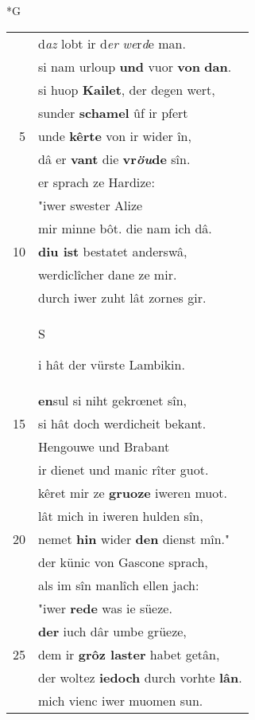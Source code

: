 \documentclass[8pt,a4paper,notitlepage]{article}
\begin{document}
\newpage
\begin{table}[ht]
\begin{minipage}[t]{0.5\linewidth}
\small
\begin{center}*G
\end{center}
\begin{tabular}{rl}
 & d\textit{az} lobt ir d\textit{er} \textit{we}r\textit{d}e man.\\ 
 & si nam urloup \textbf{und} vuor \textbf{von} \textbf{dan}.\\ 
 & si huop \textbf{Kailet}, der degen wert,\\ 
 & sunder \textbf{schamel} ûf ir pfert\\ 
5 & unde \textbf{kêrte} von ir wider în,\\ 
 & dâ er \textbf{vant} die \textbf{vr\textit{öu}de} sîn.\\ 
 & er sprach ze Hardize:\\ 
 & "iwer swester Alize\\ 
 & mir minne bôt. die nam ich dâ.\\ 
10 & \textbf{diu ist} bestatet anderswâ,\\ 
 & werdiclîcher dane ze mir.\\ 
 & durch iwer zuht lât zornes gir.\\ 
 & \begin{large}S\end{large}i hât der vürste Lambikin.\\ 
 & \textbf{en}sul si niht gekrœnet sîn,\\ 
15 & si hât doch werdicheit bekant.\\ 
 & Hengouwe und Brabant\\ 
 & ir dienet und manic rîter guot.\\ 
 & kêret mir ze \textbf{gruoze} iweren muot.\\ 
 & lât mich in iweren hulden sîn,\\ 
20 & nemet \textbf{hin} wider \textbf{den} dienst mîn."\\ 
 & der künic von Gascone sprach,\\ 
 & als im sîn manlîch ellen jach:\\ 
 & "iwer \textbf{rede} was ie süeze.\\ 
 & \textbf{der} iuch dâr umbe grüeze,\\ 
25 & dem ir \textbf{grôz laster} habet getân,\\ 
 & der woltez \textbf{iedoch} durch vorhte \textbf{lân}.\\ 
 & mich vienc iwer muomen sun.\\ 

\end{tabular}
\end{minipage}
\end{table}
\end{document}
